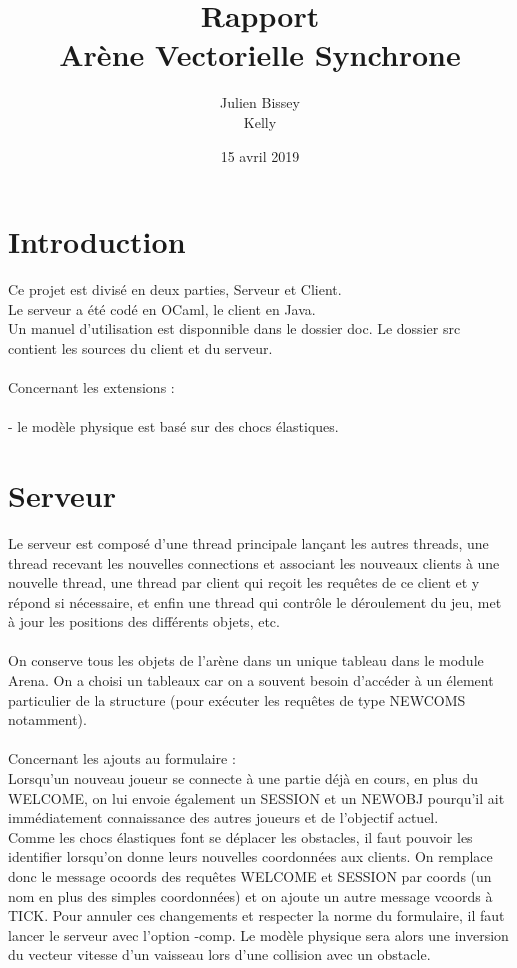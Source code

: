 \documentclass{article}
\begin{document}
\title{Rapport\\
Arène Vectorielle Synchrone{}}
\author{Julien Bissey\\Kelly}
\date{15 avril 2019}

\maketitle

\section{Introduction}

Ce projet est divisé en deux parties, Serveur et Client.\\
Le serveur a été codé en OCaml, le client en Java.\\
Un manuel d'utilisation est disponnible dans le dossier doc. Le dossier src contient les sources du client et du serveur.\\
\\
Concernant les extensions :\\
\\
- le modèle physique est basé sur des chocs élastiques.

\section{Serveur}

Le serveur est composé d'une thread principale lançant les autres threads, une thread recevant les nouvelles connections et
associant les nouveaux clients à une nouvelle thread, une thread par client qui reçoit les requêtes de ce client et y répond si nécessaire,
et enfin une thread qui contrôle le déroulement du jeu, met à jour les positions des différents objets, etc.\\
\\
On conserve tous les objets de l'arène dans un unique tableau dans le module Arena. On a choisi un tableaux car on a souvent besoin d'accéder à un
élement particulier de la structure (pour exécuter les requêtes de type NEWCOMS notamment).\\
\\
Concernant les ajouts au formulaire :\\
Lorsqu'un nouveau joueur se connecte à une partie déjà en cours, en plus du WELCOME, on lui envoie également un SESSION et un NEWOBJ
pourqu'il ait immédiatement connaissance des autres joueurs et de l'objectif actuel.\\
Comme les chocs élastiques font se déplacer les obstacles, il faut pouvoir les identifier lorsqu'on donne leurs nouvelles coordonnées aux clients.
On remplace donc le message ocoords des requêtes WELCOME et SESSION par coords (un nom en plus des simples coordonnées) et on ajoute un autre message
vcoords à TICK. Pour annuler ces changements et respecter la norme du formulaire, il faut lancer le serveur avec l'option -comp.
Le modèle physique sera alors une inversion du vecteur vitesse d'un vaisseau lors d'une collision avec un obstacle.
\end{document}
